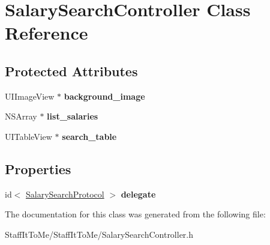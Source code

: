 \hypertarget{interface_salary_search_controller}{
\section{\-Salary\-Search\-Controller \-Class \-Reference}
\label{interface_salary_search_controller}
}
\subsection*{\-Protected \-Attributes}
\begin{DoxyCompactItemize}
\item 
\hypertarget{interface_salary_search_controller_a382633bbe98b0dfbad1cc4ff5be0a4f0}{
\-U\-I\-Image\-View $\ast$ {\bfseries background\-\_\-image}}
\label{interface_salary_search_controller_a382633bbe98b0dfbad1cc4ff5be0a4f0}

\item 
\hypertarget{interface_salary_search_controller_ae492e07e24812f228d83a53fb889fb41}{
\-N\-S\-Array $\ast$ {\bfseries list\-\_\-salaries}}
\label{interface_salary_search_controller_ae492e07e24812f228d83a53fb889fb41}

\item 
\hypertarget{interface_salary_search_controller_a1d9c0e8f9498e05ee6ef726a30d81965}{
\-U\-I\-Table\-View $\ast$ {\bfseries search\-\_\-table}}
\label{interface_salary_search_controller_a1d9c0e8f9498e05ee6ef726a30d81965}

\end{DoxyCompactItemize}
\subsection*{\-Properties}
\begin{DoxyCompactItemize}
\item 
\hypertarget{interface_salary_search_controller_a4ec29700bd53189cf59028ee7c8bdad5}{
id$<$ \hyperlink{protocol_salary_search_protocol-p}{\-Salary\-Search\-Protocol} $>$ {\bfseries delegate}}
\label{interface_salary_search_controller_a4ec29700bd53189cf59028ee7c8bdad5}

\end{DoxyCompactItemize}


\-The documentation for this class was generated from the following file\-:\begin{DoxyCompactItemize}
\item 
\-Staff\-It\-To\-Me/\-Staff\-It\-To\-Me/\-Salary\-Search\-Controller.\-h\end{DoxyCompactItemize}
